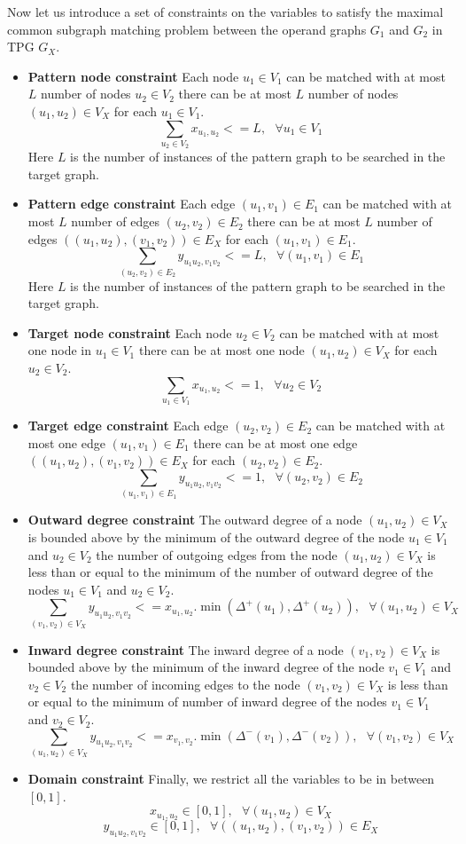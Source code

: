 Now let us introduce a set of constraints on the variables to satisfy the maximal common subgraph matching problem between the operand graphs $G_1$ and $G_2$ in TPG $G_X$.

\begin{itemize}
\item \textbf{Pattern node constraint} Each node $u_1\in V_1$ can be matched with at most $L$ number of nodes $u_2\in V_2$ \ie there can be at most $L$ number of nodes $(u_1,u_2)\in V_X$ for each $u_1\in V_1$.
\[
\sum_{u_2\in V_2}x_{u_1,u_2} <= L,\text{  }\forall u_1\in V_1
\]
Here $L$ is the number of instances of the pattern graph to be searched in the target graph.
\item \textbf{Pattern edge constraint} Each edge $(u_1,v_1)\in E_1$ can be matched with at most $L$ number of edges $(u_2,v_2)\in E_2$ \ie there can be at most $L$ number of edges $((u_1,u_2),(v_1,v_2))\in E_X$ for each $(u_1,v_1)\in E_1$.
\[
\sum_{(u_2,v_2)\in E_2}y_{u_1u_2,v_1v_2} <= L,\text{  }\forall (u_1,v_1)\in E_1
\]
Here $L$ is the number of instances of the pattern graph to be searched in the target graph.
\item \textbf{Target node constraint} Each node $u_2\in V_2$ can be matched with at most one node in $u_1\in V_1$ \ie there can be at most one node $(u_1,u_2)\in V_X$ for each $u_2\in V_2$.
\[
\sum_{u_1\in V_1}x_{u_1,u_2} <= 1,\text{  }\forall u_2\in V_2
\]
\item \textbf{Target edge constraint} Each edge $(u_2,v_2)\in E_2$ can be matched with at most one edge $(u_1,v_1)\in E_1$ \ie there can be at most one edge $((u_1,u_2),(v_1,v_2))\in E_X$ for each $(u_2,v_2)\in E_2$.
\[
\sum_{(u_1,v_1)\in E_1}y_{u_1u_2,v_1v_2} <= 1,\text{  }\forall (u_2,v_2)\in E_2
\]
\item \textbf{Outward degree constraint} The outward degree of a node $(u_1,u_2)\in V_X$ is bounded above by the minimum of the outward degree of the node $u_1\in V_1$ and $u_2\in V_2$ \ie the number of outgoing edges from the node $(u_1,u_2)\in V_X$ is less than or equal to the minimum of the number of outward degree of the nodes $u_1\in V_1$ and $u_2\in V_2$.
\[
\sum_{(v_1,v_2)\in V_X}y_{u_1u_2,v_1v_2} <= x_{u_1,u_2}.\min{(\Delta^+(u_1),\Delta^+(u_2))},\text{  }\forall(u_1,u_2)\in V_X
\]
\item \textbf{Inward degree constraint} The inward degree of a node $(v_1,v_2)\in V_X$ is bounded above by the minimum of the inward degree of the node $v_1\in V_1$ and $v_2\in V_2$ \ie the number of incoming edges to the node $(v_1,v_2)\in V_X$ is less than or equal to the minimum of number of inward degree of the nodes $v_1\in V_1$ and $v_2\in V_2$.
\[
\sum_{(u_1,u_2)\in V_X}y_{u_1u_2,v_1v_2} <= x_{v_1,v_2}.\min{(\Delta^-(v_1),\Delta^-(v_2))},\text{  }\forall(v_1,v_2)\in V_X
\]
\item \textbf{Domain constraint} Finally, we restrict all the variables to be in between $[0,1]$.
\[
x_{u_1,u_2}\in [0,1],\text{  }\forall (u_1,u_2)\in V_X
\]
\[
y_{u_1u_2,v_1v_2}\in [0,1],\text{  }\forall ((u_1,u_2),(v_1,v_2))\in E_X
\]
\end{itemize}

